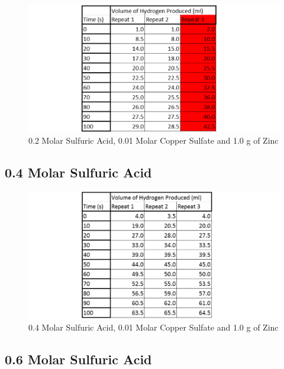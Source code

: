 \begin{figure}[H]
    \includegraphics[width=\textwidth]{./Experiment/Images/2FixedCatalyst/02Molar.pdf}
    \caption{0.2 Molar Sulfuric Acid, 0.01 Molar Copper Sulfate and 1.0 g of Zinc} \label{fig:02SACSRawData}
\end{figure}

	\subsection{0.4 Molar Sulfuric Acid}

\begin{figure}[H]
    \includegraphics[width=\textwidth]{./Experiment/Images/2FixedCatalyst/04Molar.pdf}
    \caption{0.4 Molar Sulfuric Acid, 0.01 Molar Copper Sulfate and 1.0 g of Zinc} \label{fig:04SACSRawData}
\end{figure}

	\subsection{0.6 Molar Sulfuric Acid}

